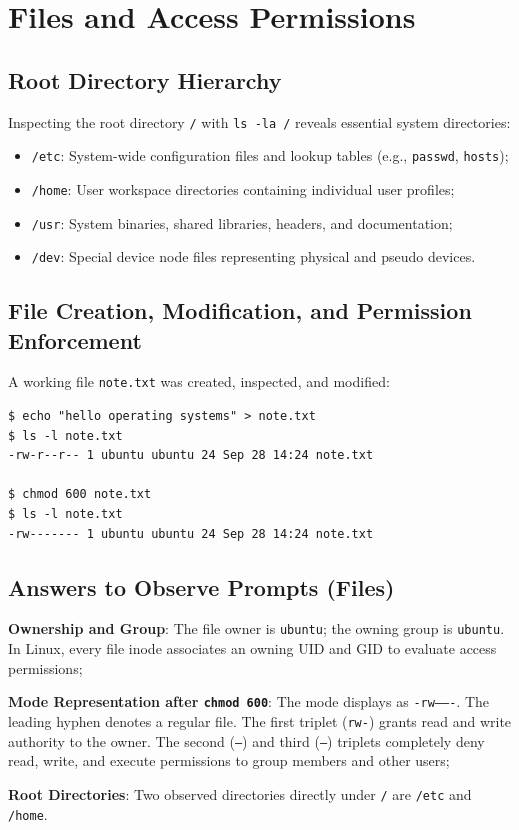 \documentclass{assets/utmreport}
\begin{document}
\chapter{Files and Access Permissions}

\section{Root Directory Hierarchy}
Inspecting the root directory \texttt{/} with \texttt{ls -la /} reveals essential system directories:
\begin{itemize}
\item \texttt{/etc}: System-wide configuration files and lookup tables (e.g., \texttt{passwd}, \texttt{hosts});
\item \texttt{/home}: User workspace directories containing individual user profiles;
\item \texttt{/usr}: System binaries, shared libraries, headers, and documentation;
\item \texttt{/dev}: Special device node files representing physical and pseudo devices.
\end{itemize}

\section{File Creation, Modification, and Permission Enforcement}
A working file \texttt{note.txt} was created, inspected, and modified:
\begin{verbatim}
$ echo "hello operating systems" > note.txt
$ ls -l note.txt
-rw-r--r-- 1 ubuntu ubuntu 24 Sep 28 14:24 note.txt

$ chmod 600 note.txt
$ ls -l note.txt
-rw------- 1 ubuntu ubuntu 24 Sep 28 14:24 note.txt
\end{verbatim}

\section{Answers to Observe Prompts (Files)}
\begin{utmenumerate}
\item \textbf{Ownership and Group}: The file owner is \texttt{ubuntu}; the owning group is \texttt{ubuntu}. In Linux, every file inode associates an owning UID and GID to evaluate access permissions;
\item \textbf{Mode Representation after \texttt{chmod 600}}: The mode displays as \texttt{-rw-------}. The leading hyphen denotes a regular file. The first triplet (\texttt{rw-}) grants read and write authority to the owner. The second (\texttt{---}) and third (\texttt{---}) triplets completely deny read, write, and execute permissions to group members and other users;
\item \textbf{Root Directories}: Two observed directories directly under \texttt{/} are \texttt{/etc} and \texttt{/home}.
\end{utmenumerate}
\end{document}
